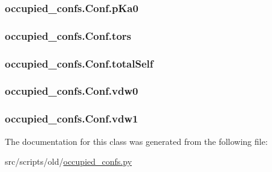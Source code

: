 \hypertarget{classoccupied__confs_1_1_conf_acce23ba752fb707934705e2388544cbc}{
\subsubsection[{p\-Ka0}]{\setlength{\rightskip}{0pt plus 5cm}occupied\-\_\-confs.\-Conf.\-p\-Ka0}}\label{classoccupied__confs_1_1_conf_acce23ba752fb707934705e2388544cbc}
\hypertarget{classoccupied__confs_1_1_conf_ae2c305a0232855e7bd218be00667fb5a}{
\subsubsection[{tors}]{\setlength{\rightskip}{0pt plus 5cm}occupied\-\_\-confs.\-Conf.\-tors}}\label{classoccupied__confs_1_1_conf_ae2c305a0232855e7bd218be00667fb5a}
\hypertarget{classoccupied__confs_1_1_conf_ad829e213e264e618aabce225db742550}{
\subsubsection[{total\-Self}]{\setlength{\rightskip}{0pt plus 5cm}occupied\-\_\-confs.\-Conf.\-total\-Self}}\label{classoccupied__confs_1_1_conf_ad829e213e264e618aabce225db742550}
\hypertarget{classoccupied__confs_1_1_conf_ac5e8f69fab016810e30c0189140539f0}{
\subsubsection[{vdw0}]{\setlength{\rightskip}{0pt plus 5cm}occupied\-\_\-confs.\-Conf.\-vdw0}}\label{classoccupied__confs_1_1_conf_ac5e8f69fab016810e30c0189140539f0}
\hypertarget{classoccupied__confs_1_1_conf_a959ce58c489f1b8a8bb9326af6e0b23b}{
\subsubsection[{vdw1}]{\setlength{\rightskip}{0pt plus 5cm}occupied\-\_\-confs.\-Conf.\-vdw1}}\label{classoccupied__confs_1_1_conf_a959ce58c489f1b8a8bb9326af6e0b23b}


The documentation for this class was generated from the following file\-:\begin{DoxyCompactItemize}
\item 
src/scripts/old/\hyperlink{occupied__confs_8py}{occupied\-\_\-confs.\-py}\end{DoxyCompactItemize}
